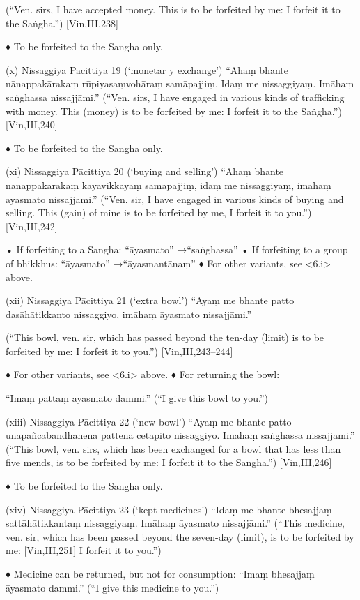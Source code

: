 (“Ven. sirs, I have accepted money. This is to be
forfeited by me: I forfeit it to the Saṅgha.”)
[Vin,III,238]

♦ To be forfeited to the Sangha only.

(x) Nissaggiya Pācittiya 19 (‘monetar y exchange’)
“Ahaṃ bhante nānappakārakaṃ rūpiyasaṃvohāraṃ samāpajjiṃ. Idaṃ me
nissaggiyaṃ. Imāhaṃ saṅghassa nissajjāmi.”
(“Ven. sirs, I have engaged in various kinds of
trafficking with money. This (money) is to be
forfeited by me: I forfeit it to the Saṅgha.”)
[Vin,III,240]

♦ To be forfeited to the Sangha only.

(xi) Nissaggiya Pācittiya 20 (‘buying and selling’)
“Ahaṃ bhante nānappakārakaṃ
kayavikkayaṃ samāpajjiṃ, idaṃ me
nissaggiyaṃ, imāhaṃ āyasmato nissajjāmi.”
(“Ven. sir, I have engaged in various kinds of buying
and selling. This (gain) of mine is to be forfeited by
me, I forfeit it to you.”)
[Vin,III,242]

• If forfeiting to a Sangha:
“āyasmato” →“saṅghassa”
• If forfeiting to a group of bhikkhus:
“āyasmato” →“āyasmantānaṃ”
♦ For other variants, see <6.i> above.

(xii) Nissaggiya Pācittiya 21 (‘extra bowl’)
“Ayaṃ me bhante patto dasāhātikkanto
nissaggiyo, imāhaṃ āyasmato nissajjāmi.”

(“This bowl, ven. sir, which has passed beyond the
ten-day (limit) is to be forfeited by me:
I forfeit it to you.”)
[Vin,III,243–244]

♦ For other variants, see <6.i> above.
♦ For returning the bowl:

“Imaṃ pattaṃ āyasmato dammi.”
(“I give this bowl to you.”)

(xiii) Nissaggiya Pācittiya 22 (‘new bowl’)
“Ayaṃ me bhante patto ūnapañcabandhanena pattena cetāpito nissaggiyo.
Imāhaṃ saṅghassa nissajjāmi.”
(“This bowl, ven. sirs, which has been exchanged for
a bowl that has less than five mends, is to be forfeited
by me: I forfeit it to the Sangha.”)
[Vin,III,246]

♦ To be forfeited to the Sangha only.

(xiv) Nissaggiya Pācittiya 23 (‘kept medicines’)
“Idaṃ me bhante bhesajjaṃ sattāhātikkantaṃ
nissaggiyaṃ. Imāhaṃ āyasmato nissajjāmi.”
(“This medicine, ven. sir, which has been passed
beyond the seven-day (limit), is to be forfeited by me:
[Vin,III,251]
I forfeit it to you.”)

♦ Medicine can be returned, but not for consumption:
“Imaṃ bhesajjaṃ āyasmato dammi.”
(“I give this medicine to you.”)

